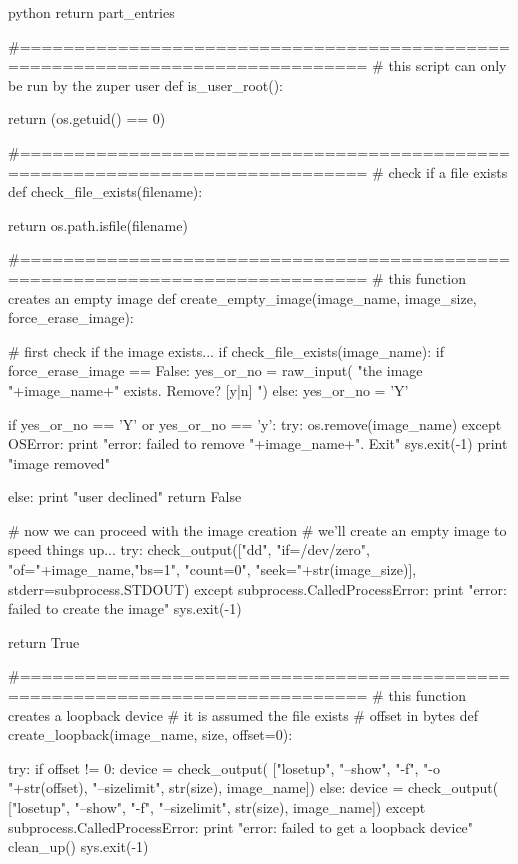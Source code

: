 \begin{code-block}{python}
    return part_entries

#==============================================================================
# this script can only be run by the zuper user
def is_user_root():

    return (os.getuid() == 0)

#==============================================================================
# check if a file exists
def check_file_exists(filename):

    return os.path.isfile(filename)

#==============================================================================
# this function creates an empty image
def create_empty_image(image_name, image_size, force_erase_image):

    # first check if the image exists...
    if check_file_exists(image_name):
        if force_erase_image == False:
            yes_or_no = raw_input(
                "the image "+image_name+" exists. Remove? [y|n] ")
        else:
            yes_or_no = 'Y'

        if yes_or_no == 'Y' or yes_or_no == 'y':
            try:
                os.remove(image_name)
            except OSError:
                print "error: failed to remove "+image_name+". Exit"
                sys.exit(-1)
            print "image removed"

        else:
            print "user declined"
            return False

    # now we can proceed with the image creation
    # we'll create an empty image to speed things up...
    try:
        check_output(["dd", "if=/dev/zero", "of="+image_name,"bs=1",
                                 "count=0", "seek="+str(image_size)],
                                stderr=subprocess.STDOUT)
    except subprocess.CalledProcessError:
        print "error: failed to create the image"
        sys.exit(-1)

    return True

#==============================================================================
# this function creates a loopback device
# it is assumed the file exists
# offset in bytes
def create_loopback(image_name, size, offset=0):

    try:
        if offset != 0:
            device = check_output(
                  ["losetup", "--show", "-f", "-o "+str(offset),
                   "--sizelimit", str(size), image_name])
        else:
            device = check_output(
                        ["losetup", "--show", "-f",
                         "--sizelimit", str(size), image_name])
    except subprocess.CalledProcessError:
        print "error: failed to get a loopback device"
        clean_up()
        sys.exit(-1)


\end{code-block}

